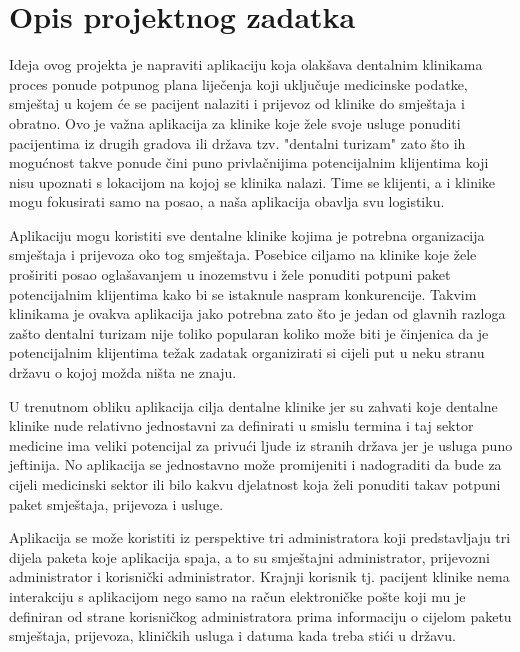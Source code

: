 \chapter{Opis projektnog zadatka}
		
		Ideja ovog projekta je napraviti aplikaciju koja olakšava dentalnim klinikama proces ponude potpunog plana liječenja koji uključuje medicinske podatke, smještaj u kojem će se pacijent nalaziti i prijevoz od klinike do smještaja i obratno. Ovo je važna aplikacija za klinike koje žele svoje usluge ponuditi pacijentima iz drugih gradova ili država tzv. "dentalni turizam" zato što ih mogućnost takve ponude čini puno privlačnijima potencijalnim klijentima koji nisu upoznati s lokacijom na kojoj se klinika nalazi. Time se klijenti, a i klinike mogu fokusirati samo na posao, a naša aplikacija obavlja svu logistiku.
		
		Aplikaciju mogu koristiti sve dentalne klinike kojima je potrebna organizacija smještaja i prijevoza oko tog smještaja. Posebice ciljamo na klinike koje žele proširiti posao oglašavanjem u inozemstvu i žele ponuditi potpuni paket potencijalnim klijentima kako bi se istaknule naspram konkurencije. Takvim klinikama je ovakva aplikacija jako potrebna zato što je jedan od glavnih razloga zašto dentalni turizam nije toliko popularan koliko može biti je činjenica da je potencijalnim klijentima težak zadatak organizirati si cijeli put u neku stranu državu o kojoj možda ništa ne znaju.
		
		U trenutnom obliku aplikacija cilja dentalne klinike jer su zahvati koje dentalne klinike nude relativno jednostavni za definirati u smislu termina i taj sektor medicine ima veliki potencijal za privući ljude iz stranih država jer je usluga puno jeftinija. No aplikacija se jednostavno može promijeniti i nadograditi da bude za cijeli medicinski sektor ili bilo kakvu djelatnost koja želi ponuditi takav potpuni paket smještaja, prijevoza i usluge.
		
		\eject
		
		Aplikacija se može koristiti iz perspektive tri administratora koji predstavljaju tri dijela paketa koje aplikacija spaja, a to su smještajni administrator, prijevozni administrator i korisnički administrator.  Krajnji korisnik tj. pacijent klinike nema interakciju s aplikacijom nego samo na račun elektroničke pošte koji mu je definiran od strane korisničkog administratora prima informaciju o cijelom paketu smještaja, prijevoza, kliničkih usluga i datuma kada treba stići u državu.
		
